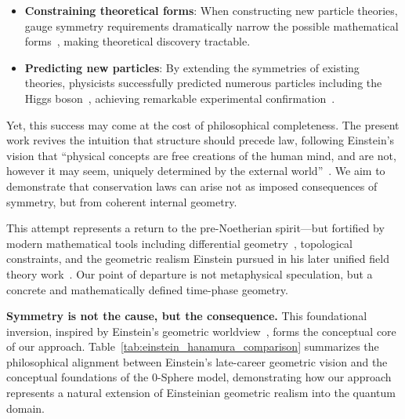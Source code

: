 \documentclass[%
 reprint,
 amsmath,amssymb,
 aps,
]{revtex4-1}
\numberwithin{equation}{section}%
\begin{document}
\begin{itemize}
\item \textbf{Constraining theoretical forms}: When constructing new particle theories, gauge symmetry requirements dramatically narrow the possible mathematical forms~\cite{thooft1971}, making theoretical discovery tractable.

\item \textbf{Predicting new particles}: By extending the symmetries of existing theories, physicists successfully predicted numerous particles including the Higgs boson~\cite{higgs1964,englert1964}, achieving remarkable experimental confirmation~\cite{aad2012,chatrchyan2012}.
\end{itemize}

Yet, this success may come at the cost of philosophical completeness. The present work revives the intuition that structure should precede law, following Einstein's vision that ``physical concepts are free creations of the human mind, and are not, however it may seem, uniquely determined by the external world''~\cite{einstein1936}. We aim to demonstrate that conservation laws can arise not as imposed consequences of symmetry, but from coherent internal geometry.

This attempt represents a return to the pre-Noetherian spirit---but fortified by modern mathematical tools including differential geometry~\cite{abraham1988}, topological constraints, and the geometric realism Einstein pursued in his later unified field theory work~\cite{einstein1955}. Our point of departure is not metaphysical speculation, but a concrete and mathematically defined time-phase geometry.

\textbf{Symmetry is not the cause, but the consequence.} This foundational inversion, inspired by Einstein's geometric worldview~\cite{einstein1915}, forms the conceptual core of our approach. Table~\ref{tab:einstein_hanamura_comparison} summarizes the philosophical alignment between Einstein's late-career geometric vision and the conceptual foundations of the 0-Sphere model, demonstrating how our approach represents a natural extension of Einsteinian geometric realism into the quantum domain.
\end{document}
